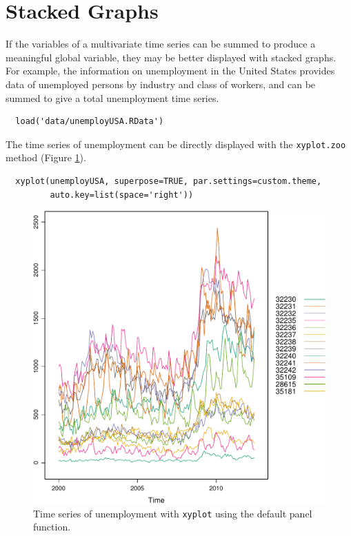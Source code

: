 \documentclass[smallroyalvopaper]{memoir}
\begin{document}
\section{Stacked Graphs \label{sec:stacked}}
\label{sec:orgad542b2}
If the variables of a multivariate time series can be summed to
produce a meaningful global variable, they may be better displayed
with stacked graphs. For example, the information on unemployment in
the United States provides data of unemployed persons by industry and
class of workers, and can be summed to give a total unemployment time
series.

\lstset{language=r,label= ,caption= ,captionpos=b,numbers=none}
\begin{lstlisting}
  load('data/unemployUSA.RData')
\end{lstlisting}

The time series of unemployment can be directly displayed
with the \texttt{xyplot.zoo} method (Figure \ref{fig:unemployUSAxyplot}).

\lstset{language=r,label= ,caption= ,captionpos=b,numbers=none}
\begin{lstlisting}
  xyplot(unemployUSA, superpose=TRUE, par.settings=custom.theme,
         auto.key=list(space='right'))
\end{lstlisting}

\begin{figure}[htbp]
\centering
\includegraphics[width=.9\linewidth]{figs/unemployUSAxyplot.pdf}
\caption{Time series of unemployment  with \texttt{xyplot} using the default panel function. \label{fig:unemployUSAxyplot}}
\end{figure}
\end{document}
